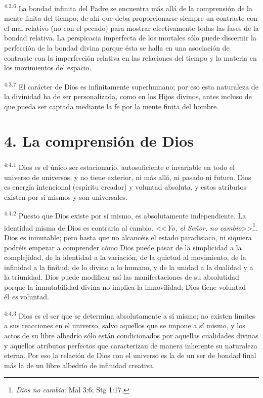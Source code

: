 \par
\textsuperscript{4:3.6} La bondad infinita del Padre se encuentra más allá de la comprensión de la mente finita del tiempo; de ahí que deba proporcionarse siempre un contraste con el mal relativo
(no con el pecado) para mostrar efectivamente todas las fases de la bondad relativa. La perspicacia imperfecta de los mortales sólo puede discernir la perfección de la bondad divina porque ésta se halla en una asociación de contraste con la imperfección relativa en las relaciones del tiempo y la materia en los movimientos del espacio.

\par
\textsuperscript{4:3.7} El carácter de Dios es infinitamente superhumano; por eso esta naturaleza de la divinidad ha de ser personalizada, como en los Hijos divinos, antes incluso de que pueda ser captada mediante la fe por la mente finita del hombre.

\section*{4. La comprensión de Dios}
\par
\textsuperscript{4:4.1} Dios es el único ser estacionario, autosuficiente e invariable en todo el universo de universos, y no tiene exterior, ni más allá, ni pasado ni futuro. Dios es energía intencional (espíritu creador) y voluntad absoluta, y estos atributos existen por sí mismos y son universales.

\par
\textsuperscript{4:4.2} Puesto que Dios existe por sí mismo, es absolutamente independiente. La identidad misma de Dios es contraria al cambio. <<\textit{Yo, el Señor, no cambio}>>\footnote{\textit{Dios no cambia}: Mal 3:6; Stg 1:17.}. Dios es inmutable; pero hasta que no alcancéis el estado paradisiaco, ni siquiera podréis empezar a comprender cómo Dios puede pasar de la simplicidad a la complejidad, de la identidad a la variación, de la quietud al movimiento, de la infinidad a la finitud, de lo divino a lo humano, y de la unidad a la dualidad y a la triunidad. Dios puede modificar así las manifestaciones de su absolutidad porque la inmutabilidad divina no implica la inmovilidad; Dios tiene voluntad ---él \textit{es} voluntad.

\par
\textsuperscript{4:4.3} Dios es el ser que se determina absolutamente a sí mismo; no existen límites a sus reacciones en el universo, salvo aquellos que se impone a sí mismo, y los actos de su libre albedrío sólo están condicionados por aquellas cualidades divinas y aquellos atributos perfectos que caracterizan de manera inherente su naturaleza eterna. Por eso la relación de Dios con el universo es la de un ser de bondad final más la de un libre albedrío de infinidad creativa.

